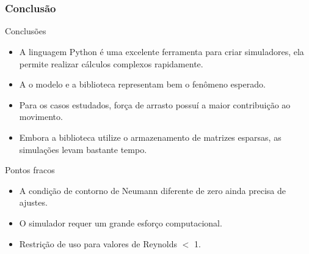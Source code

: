 \documentclass{beamer}
\begin{document}
\section*{}
\begin{frame}
  \frametitle{Conclusão}
  
  \centering
  \fontsize{10pt}{7.2}\selectfont
  \begin{block}{Conclusões}
    \begin{itemize}
      \item A linguagem Python é uma excelente ferramenta para criar simuladores, ela permite realizar cálculos complexos rapidamente.
      \item A o modelo e a biblioteca representam bem o fenômeno esperado.
      \item Para os casos estudados, força de arrasto possuí a maior contribuição ao movimento.
      \item Embora a biblioteca utilize o armazenamento de matrizes esparsas, as simulações levam bastante tempo.
    \end{itemize}
  \end{block}
  
  \begin{block}{Pontos fracos}
    \begin{itemize}
      \item A condição de contorno de Neumann diferente de zero ainda precisa de ajustes.
      \item O simulador requer um grande esforço computacional.
      \item Restrição de uso para valores de Reynolds $<$ 1.
    \end{itemize}
  \end{block}
\end{frame}

\end{document}
